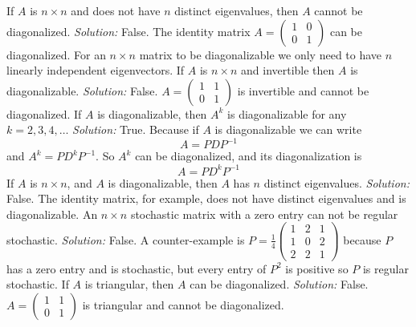 \ifnum {}         
    If $A$ is $n\times n$ and does not have $n$ distinct eigenvalues, then $A$ cannot be diagonalized. 
    \ifnum {} {\color{DarkBlue} \textit{Solution:  } False. \setlength{\extrarowheight}{0.0cm} The identity matrix $A = \begin{pmatrix} 1&0\\0&1\end{pmatrix}$ can be diagonalized. For an $n\times n$ matrix to be diagonalizable we only need to have $n$ linearly independent eigenvectors. } \fi
\fi
\ifnum {}      
    If $A$ is $n\times n$ and invertible then $A$ is diagonalizable.
    \ifnum {} {\color{DarkBlue} \textit{Solution:  } False. \setlength{\extrarowheight}{0.0cm} $A = \begin{pmatrix} 1&1\\0&1\end{pmatrix}$ is invertible and cannot be diagonalized.  } \fi
\fi    
\ifnum {}  
    If $A$ is diagonalizable, then $A^k$ is diagonalizable for any $k = 2, 3, 4, \ldots$
    \ifnum {} {\color{DarkBlue}   \textit{Solution:  } True. Because if $A$ is diagonalizable we can write $$A = PDP^{-1}$$ and $A^k = PD^kP^{-1}$. So $A^k$ can be diagonalized, and its diagonalization is $$A = PD^kP^{-1}$$} \fi
\fi    
\ifnum {}    
    If $A$ is $n\times n$, and $A$ is diagonalizable, then $A$ has $n$ distinct eigenvalues. 
    \ifnum {} {\color{DarkBlue} \textit{Solution:  } False. The identity matrix, for example, does not have distinct eigenvalues and is diagonalizable. } \fi
\fi   
\ifnum {}    
    An $n\times n$ stochastic matrix with a zero entry can not be regular stochastic. 
    \ifnum {} {\color{DarkBlue} \textit{Solution:  } False. A counter-example is  \setlength{\extrarowheight}{0.0cm} $P= \frac14 \begin{pmatrix} 1&2&1\\1&0&2\\2&2&1\end{pmatrix}$ because $P$ has a zero entry and is stochastic, but every entry of $P^2$ is positive so $P$ is regular stochastic. } \fi
\fi    
\ifnum {}      
    If $A$ is triangular, then $A$ can be diagonalized.
    \ifnum {} {\color{DarkBlue} \textit{Solution:  } False. \setlength{\extrarowheight}{0.0cm} $A = \begin{pmatrix} 1&1\\0&1\end{pmatrix}$ is triangular and cannot be diagonalized.  } \fi
